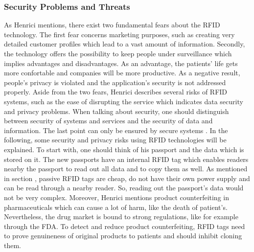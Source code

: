 \subsubsection{Security Problems and Threats} \label{problems}
 
As Henrici \cite{henrici} mentions, there exist two fundamental fears about the RFID technology. The first fear concerns marketing purposes, such as creating very detailed customer profiles which lead to a vast amount of information. Secondly, the technology offers the possibility to keep people under surveillance which implies advantages and disadvantages. As an advantage, the patients' life gets more confortable and companies will be more productive. As a negative result, people's privacy is violated and the application's security is not addressed properly.
Aside from the two fears, Henrici describes several risks of RFID systems, such as the ease of disrupting the service which indicates data security and privacy problems. When talking about security, one should distinguish between security of systems and services and the security of data and information. The last point can only be ensured by secure systems \cite{henrici}. 
In the following, some security and privacy risks using RFID technologies will be explained. To start with, one should think of his passport and the data which is stored on it. The new passports have an internal RFID tag which enables readers nearby the passport to read out all data and to copy them as well. As mentioned in section \pageref{tags}, passive RFID tags are cheap, do not have their own power supply and can be read through a nearby reader. So, reading out the passport's data would not be very complex.
Moreover, Henrici mentions product counterfeiting in pharmaceuticals which can cause a lot of harm, like the death of patient's. Nevertheless, the drug market is bound to strong regulations, like for example through the \ac{FDA}. To detect and reduce product counterfeiting, RFID tags need to prove genuineness of original products to patients and should inhibit cloning them.

